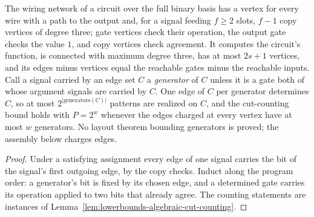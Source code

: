 \begin{lemma}
  \label{lem:lowerbounds-algebraic-wiring-generators}
  \leanok
  The wiring network of a circuit over the full binary basis has a vertex for
  every wire with a path to the output and, for a signal feeding $f\ge2$
  slots, $f-1$ copy vertices of degree three; gate vertices check their
  operation, the output gate checks the value $1$, and copy vertices check
  agreement. It computes the circuit's function, is connected with maximum
  degree three, has at most $2s+1$ vertices, and its edges minus vertices
  equal the reachable gates minus the reachable inputs. Call a signal carried
  by an edge set $C$ a \emph{generator} of $C$ unless it is a gate both of
  whose argument signals are carried by $C$. One edge of $C$ per generator
  determines $C$, so at most $2^{|\mathrm{generators}(C)|}$ patterns are
  realized on $C$, and the cut-counting bound holds with $P=2^{w}$ whenever
  the edges charged at every vertex have at most $w$ generators. No layout
  theorem bounding generators is proved; the assembly below charges edges.
\end{lemma}
\begin{proof}
  \leanok
  Under a satisfying assignment every edge of one signal carries the bit of
  the signal's first outgoing edge, by the copy checks. Induct along the
  program order: a generator's bit is fixed by its chosen edge, and a
  determined gate carries its operation applied to two bits that already
  agree. The counting statements are instances of
  Lemma~\ref{lem:lowerbounds-algebraic-cut-counting}.
\end{proof}

